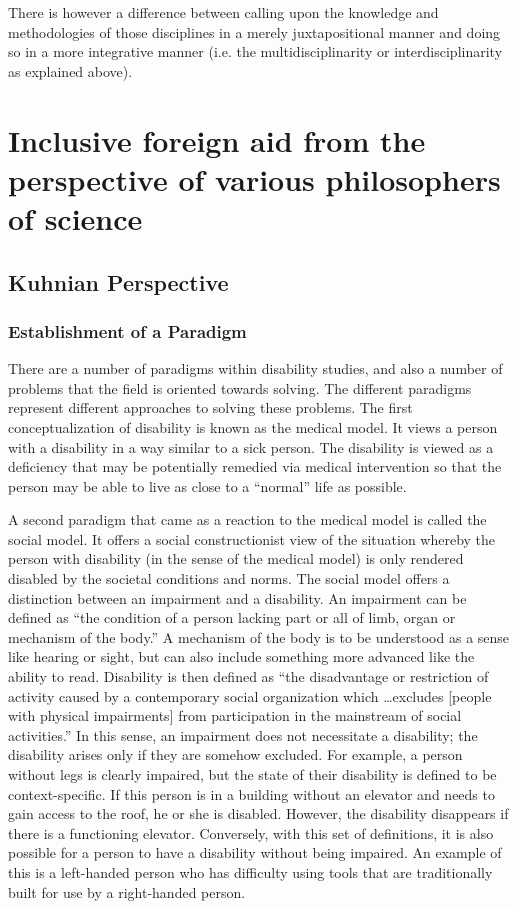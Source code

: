 \documentclass[a4paper]{article}
\begin{document}
There is however a difference between calling upon the knowledge and
methodologies of those disciplines in a merely juxtapositional manner and
doing so in a more integrative manner (i.e. the multidisciplinarity or
interdisciplinarity as explained above).

\section{Inclusive foreign aid from the perspective of various philosophers of
science}

\subsection{Kuhnian Perspective}

\subsubsection{Establishment of a Paradigm}

There are a number of paradigms within disability studies, and also a number
of problems that the field is oriented towards solving. The different
paradigms represent different approaches to solving these problems. The first
conceptualization of disability is known as the medical model. It views a
person with a disability in a way similar to a sick person. The disability is
viewed as a deficiency that may be potentially remedied via medical
intervention so that the person may be able to live as close to a ``normal''
life as possible. 

A second paradigm that came as a reaction to the medical model is called the
social model. It offers a social constructionist view of the situation whereby
the person with disability (in the sense of the medical model) is only
rendered  disabled by the societal conditions and norms. The social model
offers a distinction between an impairment and a disability. An impairment can
be defined as ``the condition of a person lacking part or all of limb, organ
or mechanism of the body.'' A mechanism of the body is to be understood as a
sense like hearing or sight, but can also include something more advanced like
the ability to read. Disability is then defined as ``the disadvantage or
restriction of activity caused by a contemporary social organization which
\ldots excludes [people with physical impairments] from participation in the
mainstream of social activities.'' In this sense, an impairment does not
necessitate a disability; the disability arises only if they are somehow
excluded. For example, a person without legs is clearly impaired, but the
state of their disability is defined to be context-specific. If this person is
in a building without an elevator and needs to gain access to the roof, he or
she is disabled. However, the disability disappears if there is a functioning
elevator. Conversely, with this set of definitions, it is also possible for a
person to have a disability without being impaired. An example of this is a
left-handed person who has difficulty using tools that are traditionally built
for use by a right-handed person.
\end{document}
